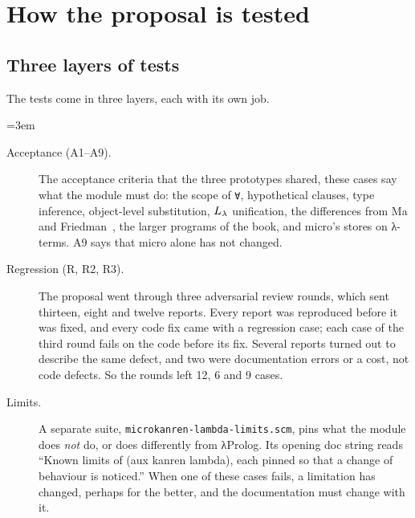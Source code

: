 \pagebreak
\section{How the proposal is tested}\label{sec:roadmap-testing}

\subsection{Three layers of tests}\label{sec:roadmap-layers}

The tests come in three layers, each with its own job.
{\emergencystretch=3em
\begin{description}
  \item[Acceptance (A1--A9).] The acceptance criteria that the three prototypes shared, these cases say what the module must
    do: the scope of \texttt{∀}, hypothetical clauses, type inference, object-level substitution, $L_\lambda$
    unification, the differences from Ma and Friedman~\cite{MaFriedman2021}, the larger programs of the
    book, and micro's stores on λ-terms. A9 says that micro alone has not changed.
  \item[Regression (R, R2, R3).] The proposal went through three adversarial review rounds, which sent
    thirteen, eight and twelve reports. Every report was reproduced before it was fixed, and every code fix
    came with a regression case; each case of the third round fails on the code before its fix. Several reports turned out to describe the
    same defect, and two were documentation errors or a cost, not code defects. So the rounds left 12, 6
    and 9 cases.
  \item[Limits.] A separate suite, \texttt{microkanren-lambda-limits.scm}, pins what the module does
    \emph{not} do, or does differently from λProlog. Its opening doc string reads \enquote{Known limits of
    (aux kanren lambda), each pinned so that a change of behaviour is noticed.} When one of these cases
    fails, a limitation has changed, perhaps for the better, and the documentation must change with it.
\end{description}
}

